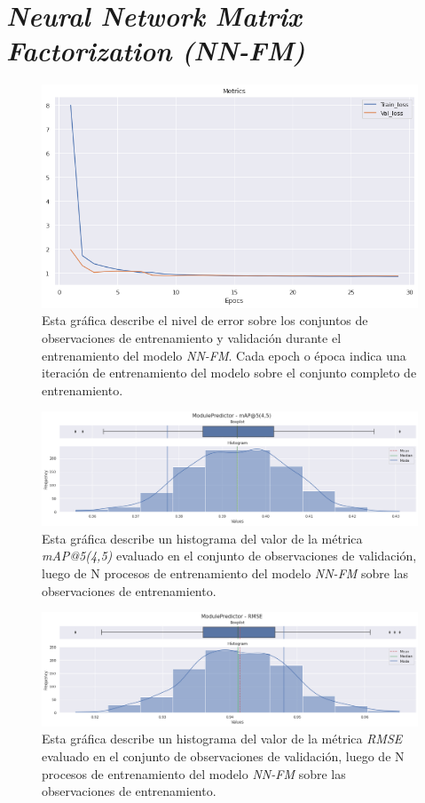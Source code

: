 \documentclass[11pt,a4paper,twoside]{thesis}
\begin{document}
\section{\textit{Neural Network Matrix Factorization (NN-FM)}}

\begin{figure}[h!]
	\centering
	\includegraphics[width=13cm]{./images/metrics-NN-FM-train-val-loss.png}
	\caption{Esta gráfica describe el nivel de error sobre los conjuntos de observaciones de entrenamiento y validación durante el entrenamiento del modelo \textit{NN-FM}. Cada epoch o época indica una iteración de entrenamiento del modelo sobre el conjunto completo de entrenamiento.}
\end{figure}

\clearpage

\begin{figure}[h!]
	\centering
	\includegraphics[width=15cm]{./images/metrics-NN-FM-mapk.png}
	\caption{Esta gráfica describe un histograma del valor de la métrica \textit{mAP@5(4,5)} evaluado en el conjunto de observaciones de validación, luego de N procesos de entrenamiento del modelo \textit{NN-FM} sobre las observaciones de entrenamiento.}
\end{figure}

\begin{figure}[h!]
	\centering
	\includegraphics[width=15cm]{./images/metrics-NN-FM-RMSE.png}
	\caption{Esta gráfica describe un histograma del valor de la métrica \textit{RMSE} evaluado en el conjunto de observaciones de validación, luego de N procesos de entrenamiento del modelo \textit{NN-FM} sobre las observaciones de entrenamiento.}
\end{figure}
\end{document}
